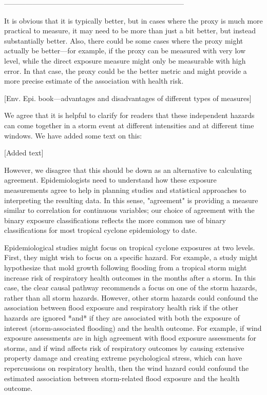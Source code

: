 ---------------------------------------------------------------------------

It is obvious that it is typically better, but in cases where the proxy is much
more practical to measure, it may need to be more than just a bit better, but
instead substantially better. Also, there could be some cases where the proxy
might actually be better---for example, if the proxy can be measured with very
low level, while the direct exposure measure might only be measurable with high
error. In that case, the proxy could be the better metric and might provide a
more precise estimate of the association with health risk.

[Env. Epi. book---advantages and disadvantages of different types of measures]

We agree that it is helpful to clarify for readers that these independent
hazards can come together in a storm event at different intensities and at
different time windows. We have added some text on this:

[Added text]

However, we disagree that this should be down as an alternative to calculating
agreement. Epidemiologists need to understand how these exposure measurements
agree to help in planning studies and statistical approaches to interpreting the
resulting data. In this sense, "agreement" is providing a measure similar to
correlation for continuous variables; our choice of agreement with the binary
exposure classifications reflects the more common use of binary classifications
for most tropical cyclone epidemiology to date.

Epidemiological studies might focus on tropical cyclone exposures at two levels.
First, they might wish to focus on a specific hazard. For example, a study might
hypothesize that mold growth following flooding from a tropical storm might
increase risk of respiratory health outcomes in the months after a storm. In
this case, the clear causal pathway recommends a focus on one of the storm
hazards, rather than all storm hazards. However, other storm hazards could
confound the association between flood exposure and respiratory health risk if
the other hazards are ignored *and* if they are associated with both the
exposure of interest (storm-associated flooding) and the health outcome. For
example, if wind exposure assessments are in high agreement with flood exposure
assessments for storms, and if wind affects risk of respiratory outcomes by
causing extensive property damage and creating extreme psychological stress,
which can have repercussions on respiratory health, then the wind hazard could
confound the estimated association between storm-related flood exposure and the
health outcome.

